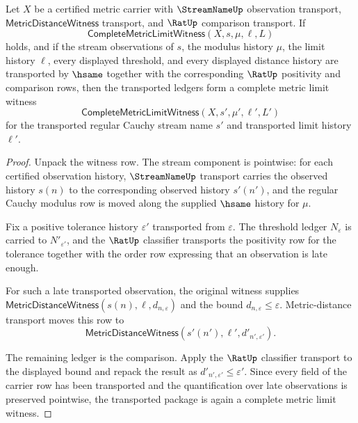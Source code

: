 \begin{theorem}
\label{thm:completemetric-limit-witness-stability}
Let $X$ be a certified metric carrier with $\StreamNameUp$ observation
transport, $\mathsf{MetricDistanceWitness}$ transport, and $\RatUp$
comparison transport. If
$$
\mathsf{CompleteMetricLimitWitness}(X,s,\mu,\ell,L)
$$
holds, and if the stream observations of $s$, the modulus history $\mu$, the
limit history $\ell$, every displayed threshold, and every displayed distance
history are transported by $\hsame$ together with the corresponding $\RatUp$
positivity and comparison rows, then the transported ledgers form a complete
metric limit witness
$$
\mathsf{CompleteMetricLimitWitness}(X,s',\mu',\ell',L')
$$
for the transported regular Cauchy stream name $s'$ and transported limit
history $\ell'$.
\end{theorem}
\begin{proof}
Unpack the witness row. The stream component is pointwise: for each certified
observation history, $\StreamNameUp$ transport carries the observed history
$s(n)$ to the corresponding observed history $s'(n')$, and the regular Cauchy
modulus row is moved along the supplied $\hsame$ history for $\mu$.

Fix a positive tolerance history $\varepsilon'$ transported from
$\varepsilon$. The threshold ledger $N_{\varepsilon}$ is carried to
$N'_{\varepsilon'}$, and the $\RatUp$ classifier transports the positivity
row for the tolerance together with the order row expressing that an
observation is late enough.

For such a late transported observation, the original witness supplies
$\mathsf{MetricDistanceWitness}(s(n),\ell,d_{n,\varepsilon})$ and the bound
$d_{n,\varepsilon}\leq\varepsilon$. Metric-distance transport moves this row
to
$$
\mathsf{MetricDistanceWitness}(s'(n'),\ell',d'_{n',\varepsilon'}).
$$

The remaining ledger is the comparison. Apply the $\RatUp$ classifier
transport to the displayed bound and repack the result as
$d'_{n',\varepsilon'}\leq\varepsilon'$. Since every field of the carrier row
has been transported and the quantification over late observations is
preserved pointwise, the transported package is again a complete metric limit
witness.
\end{proof}

